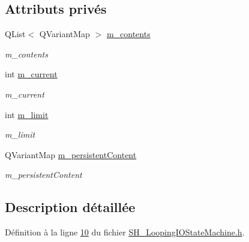 \subsection*{Attributs privés}
\begin{DoxyCompactItemize}
\item 
Q\-List$<$ Q\-Variant\-Map $>$ \hyperlink{classSh__LoopingInOutStateMachine_a267e7cbcb3d6a137e2a4e1f93fb57e68}{m\-\_\-contents}
\begin{DoxyCompactList}\small\item\em m\-\_\-contents \end{DoxyCompactList}\item 
int \hyperlink{classSh__LoopingInOutStateMachine_a6bcf7bcfe684dbd4d11ed327948e161b}{m\-\_\-current}
\begin{DoxyCompactList}\small\item\em m\-\_\-current \end{DoxyCompactList}\item 
int \hyperlink{classSh__LoopingInOutStateMachine_a320ece6cf74c2667c70059b9421117fb}{m\-\_\-limit}
\begin{DoxyCompactList}\small\item\em m\-\_\-limit \end{DoxyCompactList}\item 
Q\-Variant\-Map \hyperlink{classSh__LoopingInOutStateMachine_ad9c0db5b057a6ba340ffcaddce60d6da}{m\-\_\-persistent\-Content}
\begin{DoxyCompactList}\small\item\em m\-\_\-persistent\-Content \end{DoxyCompactList}\end{DoxyCompactItemize}


\subsection{Description détaillée}


Définition à la ligne \hyperlink{SH__LoopingIOStateMachine_8h_source_l00010}{10} du fichier \hyperlink{SH__LoopingIOStateMachine_8h_source}{S\-H\-\_\-\-Looping\-I\-O\-State\-Machine.\-h}.



